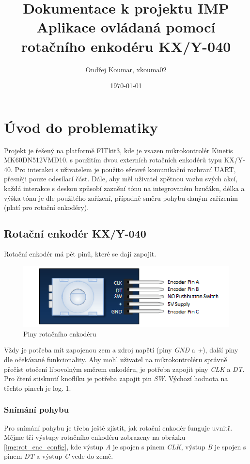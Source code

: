 \documentclass[a4paper, 11pt]{article}
\title{Dokumentace k projektu IMP \\ \Large Aplikace ovládaná pomocí rotačního enkodéru KX/Y-040}
\author{Ondřej Koumar, xkouma02}
\date{\today}
\begin{document}
\maketitle

\section{Úvod do problematiky}\label{1:uvod}
Projekt je řešený na platformě FITkit3, kde je vsazen mikrokontrolér Kinetis MK60DN512VMD10. s použitím dvou externích rotačních enkodérů typu \mbox{KX/Y-40.}
Pro interakci s uživatelem je použito sériové komunikační rozhraní UART, přesněji pouze odesílací část.
Dále, aby měl uživatel zpětnou vazbu svých akcí, každá interakce s deskou způsobí zaznění tónu na integrovaném bzučáku, délka a výška tónu je dle použitého zařízení, případně směru pohybu daným zařízením (platí pro rotační enkodéry). 

\subsection{Rotační enkodér KX/Y-040}\label{1_1:rot_enc}

Rotační enkodér má pět pinů, které se dají zapojit.
\begin{figure}[h]
    \centering
    \includegraphics[width=0.8\linewidth]{images/rotary_encoder_pins.png}
    \caption{Piny rotačního enkodéru}
    \label{img:rot_enc_pins}
\end{figure}

Vždy je potřeba mít zapojenou zem a zdroj napětí (piny \emph{GND} a \emph{+}), další piny dle očekávané funkcionality.
Aby mohl uživatel na mikrokontroléru správně přečíst otočení libovolným směrem enkodéru, je potřeba zapojit piny \emph{CLK} a \emph{DT}. Pro čtení stisknutí knoflíku je potřeba zapojit pin \emph{SW}.
Výchozí hodnota na těchto pinech je log. 1.

\subsubsection{Snímání pohybu}\label{1_1_1:snimani}

Pro snímání pohybu je třeba ještě zjistit, jak rotační enkodér funguje uvnitř.
Mějme tři výstupy rotačního enkodéru zobrazeny na obrázku \ref{img:rot_enc_config}, kde výstup \emph{A} je spojen s pinem \emph{CLK}, výstup \emph{B} je spojen s pinem \emph{DT} a výstup \emph{C} vede do země.
\end{document}
